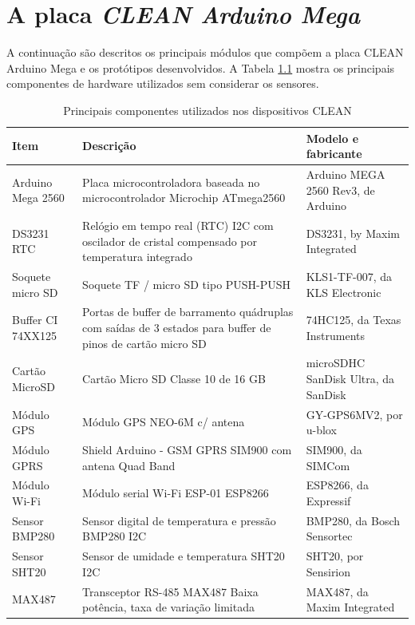 \chapter{A placa \textit{CLEAN Arduino Mega}}\label{apendix: clean-arduino-mega-board}

A continuação são descritos os principais módulos que compõem a placa CLEAN Arduino Mega e os protótipos desenvolvidos. A Tabela \ref{tab:componentes-clean} mostra os principais componentes de hardware utilizados sem considerar os sensores.

\begin{table}
    \caption{Principais componentes utilizados nos dispositivos CLEAN}
    \label{tab:componentes-clean}
    \centering
    \begin{tabularx}{0.95\textwidth}[h]{
         >{\raggedright\arraybackslash}X
         >{\raggedright\arraybackslash}X 
         >{\raggedright\arraybackslash}X }
        \hline
        \textbf{Item} & \textbf{Descrição} & \textbf{Modelo e fabricante}\\ \hline
        Arduino Mega 2560 & Placa microcontroladora baseada no microcontrolador Microchip ATmega2560 & Arduino MEGA 2560 Rev3, de Arduino\\ \hline
		DS3231 RTC & Relógio em tempo real (RTC) I2C com oscilador de cristal compensado por temperatura integrado & DS3231, by Maxim Integrated\\ \hline
		Soquete micro SD & Soquete TF / micro SD tipo PUSH-PUSH & KLS1-TF-007, da KLS Electronic\\ \hline
        Buffer CI 74XX125 & Portas de buffer de barramento quádruplas com saídas de 3 estados para buffer de pinos de cartão micro SD & 74HC125, da Texas Instruments\\ \hline
        Cartão MicroSD & Cartão Micro SD Classe 10 de 16 GB & microSDHC SanDisk Ultra, da SanDisk\\ \hline
        Módulo GPS & Módulo GPS NEO-6M c/ antena & GY-GPS6MV2, por u-blox\\ \hline
        Módulo GPRS & Shield Arduino - GSM GPRS SIM900 com antena Quad Band & SIM900, da SIMCom\\ \hline
        Módulo Wi-Fi & Módulo serial Wi-Fi ESP-01 ESP8266 & ESP8266, da Expressif\\ \hline
        Sensor BMP280 & Sensor digital de temperatura e pressão BMP280 I2C & BMP280, da Bosch Sensortec\\ \hline
        Sensor SHT20 & Sensor de umidade e temperatura SHT20 I2C & SHT20, por Sensirion\\ \hline
        MAX487 & Transceptor RS-485 MAX487 Baixa potência, taxa de variação limitada & MAX487, da Maxim Integrated\\ \hline
    \end{tabularx}
\end{table}

